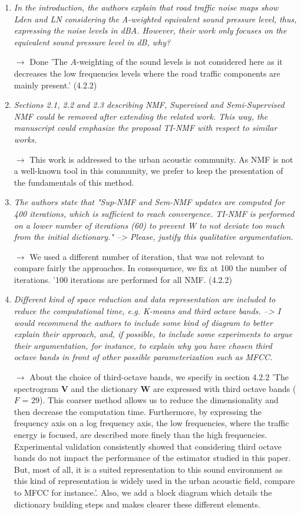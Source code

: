 \documentclass[10pt]{article}
\begin{document}
\begin{enumerate}
\item \emph{In the introduction, the authors explain that road traffic noise maps show Lden and LN considering the A-weighted equivalent sound pressure level, thus, expressing the noise levels in dBA. However, their work only focuses on the equivalent sound pressure level in dB, why? }

$\rightarrow$ Done 'The $A$-weighting of the sound levels is not considered here as it decreases the low frequencies levels where the road traffic components are mainly present.' (4.2.2)

\item \emph{Sections 2.1, 2.2 and 2.3 describing NMF, Supervised and Semi-Supervised NMF could be removed after extending the related work. This way, the manuscript could emphasize the proposal TI-NMF with respect to similar works.}

$\rightarrow$ This work is addressed to the urban acoustic community. As NMF is not a well-known tool in this community, we prefer to keep the presentation of the fundamentals of this method.

\item \emph{The authors state that "Sup-NMF and Sem-NMF updates are computed for 400 iterations, which is sufficient to reach convergence. TI-NMF is performed on a lower number of iterations (60) to prevent W to not deviate too much from the initial dictionary." --> Please, justify this qualitative argumentation.}

$\rightarrow$ We used a different number of iteration, that was not relevant to compare fairly the approaches. In consequence, we fix at 100 the number of iterations. '100 iterations are performed for all NMF. (4.2.2)

\item \emph{Different kind of space reduction and data representation are included to reduce the computational time, e.g. K-means and third octave bands. --> I would recommend the authors to include some kind of diagram to better explain their approach, and, if possible, to include some experiments to argue their argumentation, for instance, to explain why you have chosen third octave bands in front of other possible parameterization such as MFCC.}

$\rightarrow$ About the choice of third-octave bands, we specify in section 4.2.2 'The spectrogram $\mathbf{V}$ and the dictionary $\mathbf{W}$ are expressed with third octave bands ($F$ = 29). This coarser method allows us to reduce the dimensionality and then decrease the computation time. Furthermore, by expressing the frequency axis on a log frequency axis, the low frequencies, where the traffic energy is focused, are described more finely than the high frequencies. Experimental validation consistently showed that considering third octave bands do not impact the performance of the estimator studied in this paper. But, most of all, it is a suited representation to this sound environment as this kind of representation is widely used in the urban acoustic field, compare to MFCC for instance.'. Also, we add a block diagram which details the dictionary building steps and makes clearer these different elements.


\end{enumerate}
\end{document}
